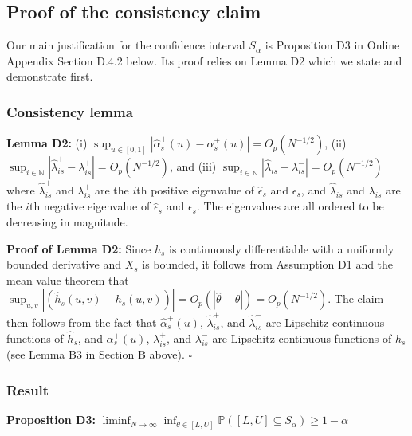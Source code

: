 \documentclass[12pt]{article}
\theoremstyle{definition}
\begin{document}
{\subsection{Proof of the consistency claim}
Our main justification for the confidence interval $S_{\alpha}$ is Proposition D3 in Online Appendix Section D.4.2 below. Its proof relies on Lemma D2  which we state and demonstrate first.  
\subsubsection{Consistency lemma}
\begin{flushleft}
\textbf{Lemma D2:} (i) $\sup_{u \in [0,1]}\left|\hat{\alpha}^{+}_{s}(u) - \alpha^{+}_{s}(u)\right| = O_{p}(N^{-1/2})$, (ii) $\sup_{i \in \mathbb{N}}\left| \hat{\lambda}_{is}^{+} - \lambda_{is}^{+}\right| = O_{p}(N^{-1/2})$, and (iii) $\sup_{i \in \mathbb{N}}\left| \hat{\lambda}_{is}^{-} - \lambda_{is}^{-}\right| = O_{p}(N^{-1/2})$ where $\hat{\lambda}_{is}^{+}$  and $\lambda_{is}^{+}$ are the $i$th positive eigenvalue of $\hat{\epsilon}_s$ and $\epsilon_{s}$, and $\hat{\lambda}_{is}^{-}$ and $\lambda_{is}^{-}$ are the $i$th negative eigenvalue of $\hat{\epsilon}_s$ and $\epsilon_{s}$. The eigenvalues are all ordered to be decreasing in magnitude.  
\end{flushleft}

\begin{flushleft}
\textbf{Proof of Lemma D2:} Since $h_s$ is continuously differentiable with a uniformly bounded derivative and $X_{s}$ is bounded, it follows from Assumption D1 and the mean value theorem that $\sup_{u,v}\left|\left(\hat{h}_{s}(u,v) - h_{s}(u,v)\right)\right| = O_{p}\left(|\hat{\theta} - \theta|\right) = O_{p}(N^{-1/2})$. The claim then follows from the fact that $\hat{\alpha}^{+}_{s}(u)$, $\hat{\lambda}_{is}^{+}$, and $\hat{\lambda}_{is}^{-}$ are Lipschitz continuous functions of $\hat{h}_{s}$, and $\alpha^{+}_{s}(u)$, $\lambda_{is}^{+}$, and $\lambda_{is}^{-}$ are Lipschitz continuous functions of $h_{s}$ (see Lemma B3 in Section B above). $\square$  
\end{flushleft}



\subsubsection{Result}
\begin{flushleft}
\textbf{Proposition D3:} $\liminf_{N\to\infty}\inf_{\theta \in \left[L,U\right]}\mathbb{P}\left( [L,U] \subseteq S_{\alpha}\right) \geq 1-\alpha$ 
\end{flushleft}

}
\end{document}
